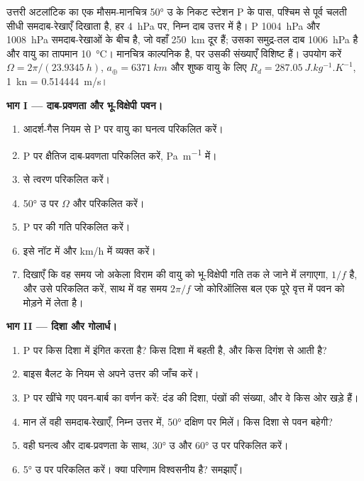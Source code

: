 \begin{problem}
\label{pb:b1:atmospheric-circulation:1}
उत्तरी अटलांटिक का एक मौसम-मानचित्र \ang{50} उ के निकट स्टेशन P के पास, पश्चिम से पूर्व चलती सीधी समदाब-रेखाएँ दिखाता है, हर \qty{4}{hPa} पर, निम्न दाब उत्तर में है। P \qty{1004}{hPa} और \qty{1008}{hPa} समदाब-रेखाओं के बीच है, जो वहाँ \qty{250}{km} दूर हैं; उसका समुद्र-तल दाब \qty{1006}{hPa} है और वायु का तापमान \qty{10}{\degreeCelsius}। मानचित्र काल्पनिक है, पर उसकी संख्याएँ विशिष्ट हैं।
उपयोग करें $\Omega = 2\pi/(\qty{23.9345}{h})$, $a_\oplus = \qty{6371}{km}$ और शुष्क वायु के लिए $R_d =
\qty{287.05}{J.kg^{-1}.K^{-1}}$, \qty{1}{kn} = \qty{0.514444}{m/s}।

\medskip
\noindent\textbf{भाग I --- दाब-प्रवणता और भू-विक्षेपी पवन।}
\begin{enumerate}
  \item आदर्श-गैस नियम से P पर वायु का घनत्व परिकलित करें।
  \item P पर क्षैतिज दाब-प्रवणता परिकलित करें, \unit{Pa.m^{-1}} में।
  \item {} से त्वरण परिकलित करें।
  \item \ang{50} उ पर $\Omega$ और  परिकलित करें।
  \item P पर  की गति परिकलित करें।
  \item इसे नॉट में और \unit{km/h} में व्यक्त करें।
  \item दिखाएँ कि वह समय जो अकेला  विराम की वायु को भू-विक्षेपी गति तक ले जाने में लगाएगा, $1/f$ है, और उसे परिकलित करें, साथ में वह समय $2\pi/f$ जो कोरिऑलिस बल एक पूरे वृत्त में पवन को मोड़ने में लेता है।
\end{enumerate}

\medskip
\noindent\textbf{भाग II --- दिशा और गोलार्ध।}
\begin{enumerate}[resume]
  \item P पर  किस दिशा में इंगित करता है?  किस दिशा में बहती है, और किस दिगंश से आती है?
  \item बाइस बैलट के नियम से अपने उत्तर की जाँच करें।
  \item P पर खींचे गए पवन-बार्ब का वर्णन करें: दंड की दिशा, पंखों की संख्या, और वे किस ओर खड़े हैं।
  \item मान लें वही समदाब-रेखाएँ, निम्न उत्तर में, \ang{50} दक्षिण पर मिलें। किस दिशा से पवन बहेगी?
  \item वही घनत्व और दाब-प्रवणता के साथ, \ang{30} उ और \ang{60} उ पर  परिकलित करें।
  \item \ang{5} उ पर परिकलित करें। क्या परिणाम विश्वसनीय है? समझाएँ।
\end{enumerate}


\end{problem}
